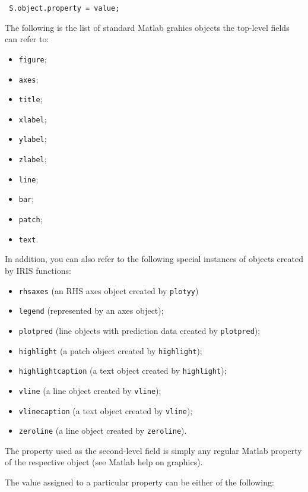  \begin{verbatim}
 S.object.property = value;
 \end{verbatim}
 
 The following is the list of standard Matlab grahics objects the
 top-level fields can refer to:
 
 \begin{itemize}
 \item
   \texttt{figure};
 \item
   \texttt{axes};
 \item
   \texttt{title};
 \item
   \texttt{xlabel};
 \item
   \texttt{ylabel};
 \item
   \texttt{zlabel};
 \item
   \texttt{line};
 \item
   \texttt{bar};
 \item
   \texttt{patch};
 \item
   \texttt{text}.
 \end{itemize}
 
 In addition, you can also refer to the following special instances of
 objects created by IRIS functions:
 
 \begin{itemize}
 \item
   \texttt{rhsaxes} (an RHS axes object created by \texttt{plotyy})
 \item
   \texttt{legend} (represented by an axes object);
 \item
   \texttt{plotpred} (line objects with prediction data created by
   \texttt{plotpred});
 \item
   \texttt{highlight} (a patch object created by \texttt{highlight});
 \item
   \texttt{highlightcaption} (a text object created by
   \texttt{highlight});
 \item
   \texttt{vline} (a line object created by \texttt{vline});
 \item
   \texttt{vlinecaption} (a text object created by \texttt{vline});
 \item
   \texttt{zeroline} (a line object created by \texttt{zeroline}).
 \end{itemize}
 
 The property used as the second-level field is simply any regular Matlab
 property of the respective object (see Matlab help on graphics).
 
 The value assigned to a particular property can be either of the
 following:
 
